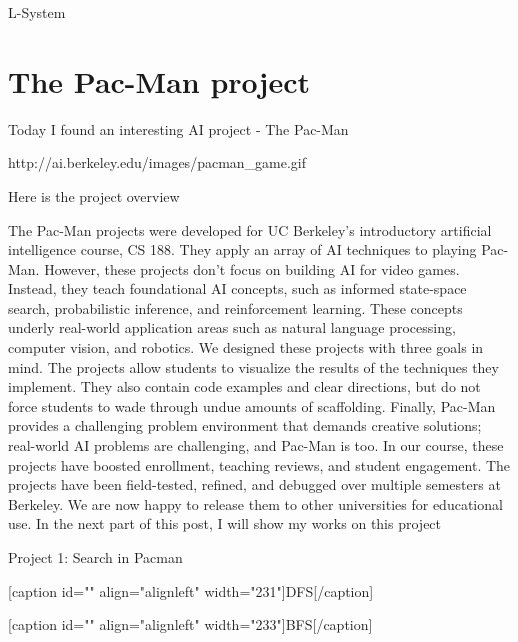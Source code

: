 L-System

\section{The Pac-Man project}

Today I found an interesting AI project - The Pac-Man

http://ai.berkeley.edu/images/pacman_game.gif

Here is the project overview

The Pac-Man projects were developed for UC Berkeley's introductory artificial intelligence course, CS 188. They apply an array of AI techniques to playing Pac-Man. However, these projects don't focus on building AI for video games. Instead, they teach foundational AI concepts, such as informed state-space search, probabilistic inference, and reinforcement learning. These concepts underly real-world application areas such as natural language processing, computer vision, and robotics. We designed these projects with three goals in mind. The projects allow students to visualize the results of the techniques they implement. They also contain code examples and clear directions, but do not force students to wade through undue amounts of scaffolding. Finally, Pac-Man provides a challenging problem environment that demands creative solutions; real-world AI problems are challenging, and Pac-Man is too. In our course, these projects have boosted enrollment, teaching reviews, and student engagement. The projects have been field-tested, refined, and debugged over multiple semesters at Berkeley. We are now happy to release them to other universities for educational use.
In the next part of this post, I will show my works on this project

Project 1: Search in Pacman

[caption id="" align="alignleft" width="231"]DFS[/caption]

[caption id="" align="alignleft" width="233"]BFS[/caption]